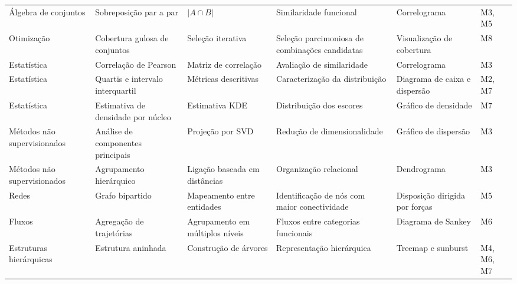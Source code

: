\begin{table}[!p]
\begin{tabularx}{\textwidth}{
    @{}
    p{1.75cm}
    p{2.25cm}
    p{2.65cm}
    X
    p{2.55cm}
    p{1.15cm}
    @{}
}
Álgebra de conjuntos
& Sobreposição par a par
& $\lvert A \cap B\rvert$
& Similaridade funcional
& Correlograma
& M3, M5 \\

\addlinespace[0.3em]

Otimização
& Cobertura gulosa de conjuntos
& Seleção iterativa
& Seleção parcimoniosa de combinações candidatas
& Visualização de cobertura
& M8 \\

\addlinespace[0.3em]

Estatística
& Correlação de Pearson
& Matriz de correlação
& Avaliação de similaridade
& Correlograma
& M3 \\

Estatística
& Quartis e intervalo interquartil
& Métricas descritivas
& Caracterização da distribuição
& Diagrama de caixa e dispersão
& M2, M7 \\

Estatística
& Estimativa de densidade por núcleo
& Estimativa KDE
& Distribuição dos escores
& Gráfico de densidade
& M7 \\

\addlinespace[0.3em]

Métodos não supervisionados
& Análise de componentes principais
& Projeção por SVD
& Redução de dimensionalidade
& Gráfico de dispersão
& M3 \\

Métodos não supervisionados
& Agrupamento hierárquico
& Ligação baseada em distâncias
& Organização relacional
& Dendrograma
& M3 \\

\addlinespace[0.3em]

Redes
& Grafo bipartido
& Mapeamento entre entidades
& Identificação de nós com maior conectividade
& Disposição dirigida por forças
& M5 \\

\addlinespace[0.3em]

Fluxos
& Agregação de trajetórias
& Agrupamento em múltiplos níveis
& Fluxos entre categorias funcionais
& Diagrama de Sankey
& M6 \\

\addlinespace[0.3em]

Estruturas hierárquicas
& Estrutura aninhada
& Construção de árvores
& Representação hierárquica
& Treemap e sunburst
& M4, M6, M7 \\

\bottomrule
\end{tabularx}
\end{table}

